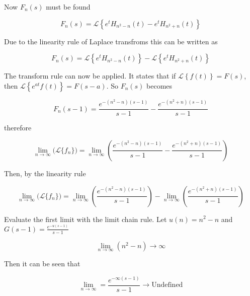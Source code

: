 \documentclass[a4paper,10pt,reqno]{amsart}
\numberwithin{equation}{section}
\newcommand{\lap}{\mathscr{L}}
\begin{document}
Now $F_n(s)$ must be found

\begin{equation}
     F_n(s) = \lap\left\{e^t H_{n^2 - n}(t) - e^t H_{n^2 + n}(t)\right\}
\end{equation}
\vspace{1pt}

Due to the linearity rule of Laplace transfroms this can be written as

\begin{equation}
     F_n(s) = \lap\left\{e^t H_{n^2 - n}(t)\right\} - \lap\left\{e^t H_{n^2 + n}(t)\right\}
\end{equation}
\vspace{1pt}

The transform rule can now be applied. It states that if $\lap\left\{f(t)\right\} = F(s)$, then $\lap\left\{e^{at} f(t)\right\} = F(s - a)$. So $F_n(s)$ becomes

\begin{equation}
     F_n(s - 1) = \frac{e^{-(n^2 - n)(s-1)}}{s-1} - \frac{e^{-(n^2 + n)(s-1)}}{s-1}
\end{equation}
\vspace{1pt}

therefore

\begin{equation}
     \lim_{n \to \infty} \big(\lap\{f_n\}\big) = \lim_{n \to \infty} \left(\frac{e^{-(n^2 - n)(s-1)}}{s-1} - \frac{e^{-(n^2 + n)(s-1)}}{s-1}\right)
\end{equation}
\vspace{1pt}

Then, by the linearity rule

\begin{equation}
     \lim_{n \to \infty} \big(\lap\{f_n\}\big) = \lim_{n \to \infty} \left(\frac{e^{-(n^2 - n)(s-1)}}{s-1}\right) - \lim_{n \to \infty}\left(\frac{e^{-(n^2 + n)(s-1)}}{s-1}\right)
\end{equation}
\vspace{1pt}

Evaluate the first limit with the limit chain rule. Let $u(n) = n^2 - n$ and $G(s - 1) = \frac{e^{-u(s - 1)}}{s - 1}$

\begin{equation}
     \lim_{n \to \infty} (n^2 - n) \to \infty
\end{equation}
\vspace{1pt}

Then it can be seen that

\begin{equation}
     \lim_{n \to \infty} = \frac{e^{-\infty(s - 1)}}{s - 1} \to \text{Undefined}
\end{equation}
\vspace{1pt}
\end{document}

